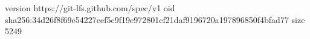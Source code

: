 version https://git-lfs.github.com/spec/v1
oid sha256:34d26f8f69e54227eef5c9f19e972801cf21daf9196720a197896850f4bfad77
size 5249
